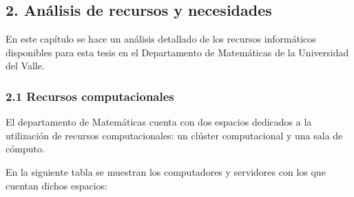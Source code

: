 \begin{spacing}{1.5}
  \begin{tightcenter}
    \section{2. Análisis de recursos y necesidades}
    \mylinespacing
  \end{tightcenter}

  En este capítulo se hace un análisis detallado de los recursos informáticos
  disponibles para esta tesis en el Departamento de Matemáticas de la Universidad
  del Valle.

  \subsubsection{2.1 Recursos computacionales}
  El departamento de Matemáticas cuenta con dos espacios dedicados a la
  utilización de recursos computacionales: un clúster computacional y una sala de
  cómputo.

  En la siguiente tabla se muestran los computadores y servidores con los que
  cuentan dichos espacios:
  \vspace{3mm}


\end{spacing}
